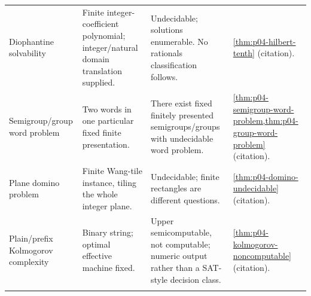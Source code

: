 \begin{landscape}
\begin{longtable}{@{}p{.18\linewidth}p{.25\linewidth}p{.23\linewidth}p{.26\linewidth}@{}}
Diophantine solvability & Finite integer-coefficient polynomial; integer/natural domain translation supplied. & Undecidable; solutions enumerable. No rationals classification follows. & \cref{thm:p04-hilbert-tenth} (citation).\\\addlinespace
Semigroup/group word problem & Two words in one particular fixed finite presentation. & There exist fixed finitely presented semigroups/groups with undecidable word problem. & \cref{thm:p04-semigroup-word-problem,thm:p04-group-word-problem} (citation).\\\addlinespace
Plane domino problem & Finite Wang-tile instance, tiling the whole integer plane. & Undecidable; finite rectangles are different questions. & \cref{thm:p04-domino-undecidable} (citation).\\\addlinespace
Plain/prefix Kolmogorov complexity & Binary string; optimal effective machine fixed. & Upper semicomputable, not computable; numeric output rather than a SAT-style decision class. & \cref{thm:p04-kolmogorov-noncomputable} (citation).\\\addlinespace
\end{longtable}
\endgroup
\end{landscape}

